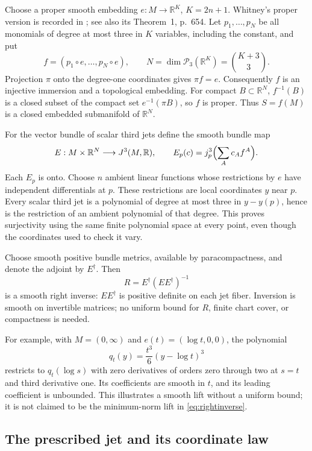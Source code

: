 \documentclass[10pt,letterpaper]{article}
\newcommand{\R}{\mathbb R}
\begin{document}
Choose a proper smooth embedding $e:M\to\R^K$, $K=2n+1$. Whitney's
proper version is recorded in \cite[Lemma~19, p.~665 and footnote~32]{Whitney};
see also its Theorem~1, p.~654. Let $p_1,\ldots,p_N$ be all monomials of
degree at most three in $K$ variables, including the constant, and put
\begin{equation}\label{eq:feature}
 f=(p_1\circ e,\ldots,p_N\circ e),\qquad
 N=\dim\mathcal P_3(\R^K)=\binom{K+3}{3}.
\end{equation}
Projection $\pi$ onto the degree-one coordinates gives $\pi f=e$.
Consequently $f$ is an injective immersion and a topological embedding.
For compact $B\subset\R^N$, $f^{-1}(B)$ is a closed subset of the compact
set $e^{-1}(\pi B)$, so $f$ is proper. Thus $S=f(M)$ is a closed embedded
submanifold of $\R^N$.

For the vector bundle of scalar third jets define the smooth bundle map
\[
 E:M\times\R^N\longrightarrow J^3(M,\R),\qquad
 E_p(c)=j^3_p\Bigl(\sum_A c_A f^A\Bigr).
\]
Each $E_p$ is onto. Choose $n$ ambient linear functions whose restrictions
by $e$ have independent differentials at $p$. These restrictions are local
coordinates $y$ near $p$. Every scalar third jet is a polynomial of degree
at most three in $y-y(p)$, hence is the restriction of an ambient polynomial
of that degree. This proves surjectivity using the same finite polynomial
space at every point, even though the coordinates used to check it vary.

Choose smooth positive bundle metrics, available by paracompactness, and
denote the adjoint by $E^\dagger$. Then
\begin{equation}\label{eq:rightinverse}
 R=E^\dagger(EE^\dagger)^{-1}
\end{equation}
is a smooth right inverse: $EE^\dagger$ is positive definite on each jet
fiber. Inversion is smooth on invertible matrices; no uniform bound for
$R$, finite chart cover, or compactness is needed.

For example, with $M=(0,\infty)$ and $e(t)=(\log t,0,0)$, the polynomial
\[
 q_t(y)=\frac{t^3}{6}(y-\log t)^3
\]
restricts to $q_t(\log s)$ with zero derivatives of orders zero through two
at $s=t$ and third derivative one. Its coefficients are smooth in $t$,
and its leading coefficient is unbounded. This illustrates a smooth lift
without a uniform bound; it is not claimed to be the minimum-norm lift
in \eqref{eq:rightinverse}.

\subsection*{The prescribed jet and its coordinate law}
\end{document}
